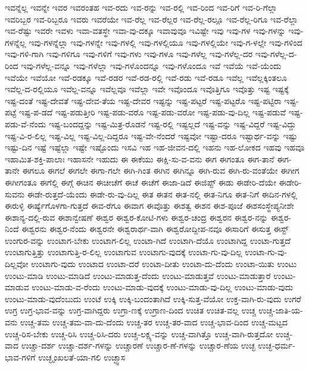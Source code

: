 {ಇವನ್ನೆಲ್ಲ
ಇವನ್ನೇ
ಇವರ
ಇವರಂತಹ
ಇವ-ರದು
ಇವ-ರನ್ನು
ಇವ-ರಲ್ಲಿ
ಇವ-ರಿಂದ
ಇವ-ರಿಗೆ
ಇವ-ರಿ-ಗೆಲ್ಲಾ
ಇವರಿಬ್ಬರ
ಇವ-ರಿಬ್ಬರೂ
ಇವರು
ಇವರೆಯೇ
ಇವ-ರೆಲ್ಲ
ಇವ-ರೆಲ್ಲರ
ಇವ-ರೆಲ್ಲ-ರಲ್ಲೂ
ಇವ-ರೆಲ್ಲ-ರಿಗೂ
ಇವ-ರೆಲ್ಲಾ
ಇವ-ರೆಷ್ಟು
ಇವರೇ
ಇವಳು
ಇವಾ-ವತಸ್ಥೇ
ಇವಾ-ವು-ದಕ್ಕೂ
ಇವಾವುವೂ
ಇವಿಷ್ಟೇ
ಇವು
ಇವು-ಗಳ
ಇವು-ಗಳನ್ನು
ಇವು-ಗಳನ್ನೆಲ್ಲ
ಇವು-ಗಳನ್ನೆಲ್ಲಾ
ಇವು-ಗಳನ್ನೇ
ಇವು-ಗಳಲ್ಲಿ
ಇವು-ಗಳಲ್ಲಿಯೂ
ಇವು-ಗಳಲ್ಲಿಯೇ
ಇವು-ಗ-ಳಲ್ಲೇ
ಇವು-ಗಳಿಂದ
ಇವು-ಗಳಿ-ಗಾಗಿ
ಇವು-ಗಳಿಗೂ
ಇವು-ಗಳಿಗೆ
ಇವು-ಗಳು
ಇವು-ಗಳೂ
ಇವು-ಗಳೆಲ್ಲ
ಇವು-ಗಳೆಲ್ಲ-ದರ
ಇವು-ಗಳೆಲ್ಲ-ದ-ರಿಂದ
ಇವು-ಗಳೆಲ್ಲ-ವನ್ನೂ
ಇವು-ಗಳೆಲ್ಲಾ
ಇವು-ಗಳೊಂದನ್ನೂ
ಇವು-ಗಳೊಂದೂ
ಇವೆ
ಇವೆಯೆ
ಇವೆ-ಯೆಂದು
ಇವೆಯೇ
ಇವೆಯೋ
ಇವೆ-ರಡಕ್ಕೂ
ಇವೆ-ರಡರ
ಇವೆ-ರಡ-ರಲ್ಲಿ
ಇವೆ-ರಡು
ಇವೆ-ರಡೂ
ಇವೆಲ್ಲ
ಇವೆಲ್ಲಕ್ಕಿಂತಲೂ
ಇವೆಲ್ಲ-ದ-ರಲ್ಲಿಯೂ
ಇವೆಲ್ಲ-ವನ್ನೂ
ಇವೆಲ್ಲವೂ
ಇವೆಲ್ಲಾ
ಇವೇ
ಇವೊಂದೂ
ಇವೊತ್ತಿಗೂ
ಇವೊತ್ತು
ಇಷ್ಟ
ಇಷ್ಟಕ್ಕೆ
ಇಷ್ಟ-ದಂತೆ
ಇಷ್ಟ-ದೇವತೆ
ಇಷ್ಟ-ದೇವ-ತೆಯ
ಇಷ್ಟ-ದೇವರ
ಇಷ್ಟನ್ನು
ಇಷ್ಟ-ಪಟ್ಟರೆ
ಇಷ್ಟ-ಪಟ್ಟರೊ
ಇಷ್ಟ-ಪಟ್ಟಿರಾ
ಇಷ್ಟ-ಪಟ್ಟೆ
ಇಷ್ಟ-ಪ-ಡದೆ
ಇಷ್ಟ-ಪಡುತ್ತೀರಿ
ಇಷ್ಟ-ಪಡು-ವರೊ
ಇಷ್ಟ-ಪಡು-ವರೋ
ಇಷ್ಟ-ಪಡು-ವು-ದಿಲ್ಲ
ಇಷ್ಟ-ಪಡುವೆ
ಇಷ್ಟ-ಪಡು-ವೆ-ನೆಂದು
ಇಷ್ಟ-ಬಂದದ್ದನ್ನು
ಇಷ್ಟ-ಮಿತ್ರ-ರೊಡನೆ
ಇಷ್ಟ-ರಲ್ಲಿ
ಇಷ್ಟಲ್ಲದೆ
ಇಷ್ಟ-ವನ್ನು
ಇಷ್ಟ-ವಿದ್ದರೆ
ಇಷ್ಟ-ವಿದ್ದು
ಇಷ್ಟ-ವಿ-ರ-ಲಿಲ್ಲ
ಇಷ್ಟ-ವಿಲ್ಲ
ಇಷ್ಟ-ವಿಲ್ಲ-ದಿದ್ದರೂ
ಇಷ್ಟ-ವೇ-ನೆಂದರೆ
ಇಷ್ಟವೋ
ಇಷ್ಟಾ-ದರೂ
ಇಷ್ಟಾರ್ಥ-ವನ್ನು
ಇಷ್ಟು
ಇಷ್ಟು-ದಿನ
ಇಷ್ಟೆ
ಇಷ್ಟೆಲ್ಲಾ
ಇಷ್ಟೇ
ಇಷ್ಟೊಂದು
ಇಸವಿ
ಇಹ
ಇಹ-ಜೀವನ-ದಲ್ಲಿ
ಇಹನು
ಇಹ-ಲೋಕದ
ಇಹವು
ಇಹವೂ
ಇಹಾಮಿತ-ಶಕ್ತಿ-ಪಾಲಾಃ
ಇಹಾಸನೇ
ಇಹುದು
ಈ
ಈಕೆಯು
ಈಕ್ಷಿ-ಸು-ವ-ವನು
ಈಗ
ಈಗಂತೂ
ಈಗ-ತಾನೆ
ಈಗ-ತಾನೇ
ಈಗಲೂ
ಈಗಲೆ
ಈಗಲೇ
ಈಗಾ-ಗಲೇ
ಈಗಿ-ಗಿಂತ
ಈಗಿನ
ಈಗಿನ್ನೂ
ಈಗಿ-ರುವ
ಈಗಿ-ರು-ವಂತೆಯೇ
ಈಗೀಗ
ಈಗೀಗಂತೂ
ಈಗೆಲ್ಲಿ
ಈಗ್ಗೆ
ಈಚಿನ
ಈಚೀಚೆಗೆ
ಈಚೆ
ಈಚೆಗೆ
ಈಜಾ-ಡಿದೆ
ಈಜಿಪ್ಟ್
ಈಡು
ಈಡೇರಿ-ದೆಯೇ
ಈಡೇರಿ-ಸುವನು
ಈಡೇ-ರುತ್ತದೆ-ಯೆಂದು
ಈಡೇ-ರು-ವು-ದಿಲ್ಲ
ಈತ
ಈತನ
ಈತ-ನಲ್ಲಿ
ಈತ-ನಿಗೂ
ಈತ-ನಿಗೆ
ಈದಿನ-ಗಳಲ್ಲಿ
ಈರುಳ್ಳಿ
ಈರ್ಷ್ಯೆಗೊಳಗಾ-ಗುತ್ತದೆ
ಈವ-ರೆಗೂ
ಈವಾಗ
ಈವೊತ್ತು
ಈಶತ್ವ
ಈಶನ
ಈಶ-ಪೂಜೆ
ಈಶಸಂಸ್ಥೇಪ್ಯನೀಶೇ
ಈಶಾನ್ಯ-ದಲ್ಲಿ-ರುವ
ಈಶಾನ್ವೇಷಣೆ
ಈಶ್ವರ
ಈಶ್ವರ-ಕೋಟಿ-ಗಳು
ಈಶ್ವರ-ಚಂದ್ರ
ಈಶ್ವರನ
ಈಶ್ವರ-ನನ್ನು
ಈಶ್ವರ-ನಿಂದೆ
ಈಶ್ವರನು
ಈಶ್ವರ-ನೆಂದು
ಈಶ್ವರನೇ
ಈಶ್ವರಾರ್ಥ-ವಾಗಿ
ಈಶ್ವರೋದ್ದೀಪ-ನವೂ
ಈಸಾರಿಗೆ
ಈಸುತ್ತ
ಈಸ್ಟ್
ಉಂಗುರ-ವನ್ನು
ಉಂಟಾಗ-ಬೇಕು
ಉಂಟಾಗ-ಲಿಲ್ಲ
ಉಂಟಾ-ಗಿದೆ
ಉಂಟಾಗಿ-ದೆಯೊ
ಉಂಟಾಗಿದ್ದ
ಉಂಟಾ-ಗುತ್ತದೆ
ಉಂಟಾಗುತ್ತಿತ್ತು
ಉಂಟಾಗುತ್ತಿ-ರ-ಲಿಲ್ಲ
ಉಂಟಾಗುವ
ಉಂಟಾಗು-ವುದಕ್ಕೆ
ಉಂಟಾ-ಗು-ವು-ದಿಲ್ಲ
ಉಂಟಾ-ಗು-ವು-ದಿಲ್ಲವೋ
ಉಂಟಾಗು-ವುದು
ಉಂಟಾದ
ಉಂಟಾ-ದರೆ
ಉಂಟಾ-ದೀತು
ಉಂಟಾ-ದು-ದೆಂದು
ಉಂಟಾ-ಯಿತು
ಉಂಟು
ಉಂಟು-ಮಾಡಿ
ಉಂಟು-ಮಾಡಿದೆ
ಉಂಟು-ಮಾಡುತ್ತ-ದೆಂದು
ಉಂಟು-ಮಾಡುತ್ತವೆ
ಉಂಟು-ಮಾಡುತ್ತಾರೆ
ಉಂಟು-ಮಾಡುವ
ಉಂಟು-ಮಾಡು-ವ-ರೆಂದು
ಉಂಟು-ಮಾಡು-ವುದಕ್ಕೆ
ಉಂಟು-ಮಾಡು-ವು-ದಿಲ್ಲ
ಉಂಟು-ಮಾಡು-ವುದು
ಉಂಟು-ಮಾಡು-ವುದೆಂಬುದು
ಉಂಟೆ
ಉಕ್ಕಿ
ಉಕ್ಕಿ-ಬಂದಂತಾಗಿದೆ
ಉಕ್ಕಿ-ಸುತ್ತ-ವೆಯೋ
ಉಕ್ತ-ವಾಗಿ-ರು-ವುದು
ಉಗರೆ
ಉಗ್ರ
ಉಗ್ರ-ಭಾವ-ವನ್ನು
ಉಗ್ರ-ವಾಗಿದ್ದರು
ಉಗ್ರಾ-ಣಕ್ಕೆ
ಉಗ್ರಾಣ-ದಿಂದ
ಉಚಿತ
ಉಚಿತ-ವಲ್ಲ
ಉಚ್ಚ
ಉಚ್ಚ-ಜಾತಿ-ಯ-ವನು
ಉಚ್ಚ-ತಮ
ಉಚ್ಚ-ತಮ-ವಾ-ದು-ದೆಂದು
ಉಚ್ಚ-ತರ
ಉಚ್ಚ-ತರ-ವಾದ
ಉಚ್ಚ-ಭಾವ-ದಿಂದ
ಉಚ್ಚ-ಮಟ್ಟದ
ಉಚ್ಚ-ರಿಸ-ಬೇಕು
ಉಚ್ಚ-ರಿಸಿ
ಉಚ್ಚ-ರಿಸಿ-ದರು
ಉಚ್ಚ-ಲಕ್ಷ್ಯ-ವನ್ನು
ಉಚ್ಚ-ವಾಗಿತ್ತೊ
ಉಚ್ಚ-ವಾಗಿ-ರುತ್ತದೋ
ಉಚ್ಚ-ವಾದ
ಉಚ್ಚಾ-ದರ್ಶ
ಉಚ್ಚಾ-ದರ್ಶ-ಗಳನ್ನು
ಉಚ್ಚಾರಣೆ
ಉಚ್ಚಾರ-ಣೆ-ಗಳನ್ನು
ಉಚ್ಚಾರ-ಣೆಯ
ಉಚ್ಛ
ಉಚ್ಛ-ಧರ್ಮ-ಭಾವ-ಗಳಿಗೆ
ಉಚ್ಛೃಂಖಲತೆ-ಯಾ-ಗಲಿ
ಉಚ್ಛ್ವಾಸ
}
